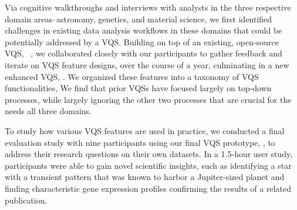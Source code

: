 \par Via cognitive walkthroughs and interviews with analysts in the three respective domain areas--astronomy, genetics, and material science, we first identified challenges in existing data analysis workflows in these domains
that could be potentially addressed by a VQS. Building on top of an existing, open-source VQS, \zv~\cite{Siddiqui2017,Siddiqui2017VLDB}, we collaborated closely with our participants to gather feedback and iterate on VQS feature designs,
over the course of a year, culminating in a new enhanced VQS, \zvpp. We organized these features into a taxonomy of VQS functionalities,  We find that prior VQSs have focused largely on top-down processes, while largely ignoring the other two processes that are crucial for the needs  all three domains.

\par 
To study how various VQS features 
are used in practice, 
we conducted a final evaluation study with nine participants 
using our final VQS prototype, \zvpp, 
to address their research questions 
on their own datasets. 
In a 1.5-hour user study, participants were able to 
gain novel scientific insights, 
such as identifying a star with a transient pattern 
that was known to harbor a Jupiter-sized planet 
and finding characteristic gene expression profiles confirming the results of a related publication.  

